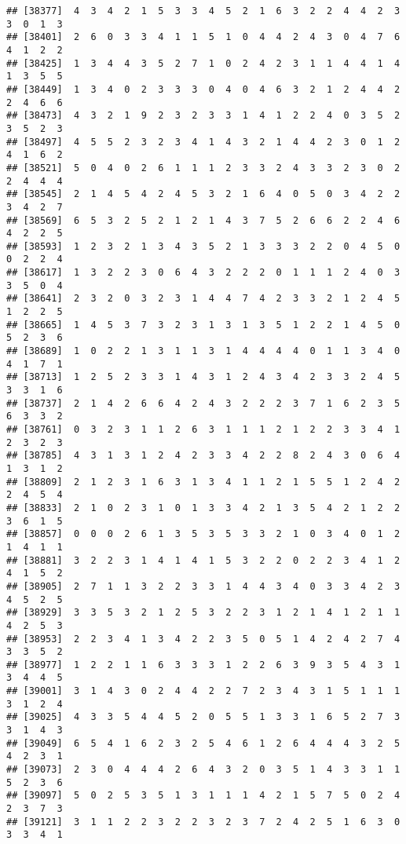 \documentclass[
]{article}
\begin{document}
\begin{verbatim}
## [38377]  4  3  4  2  1  5  3  3  4  5  2  1  6  3  2  2  4  4  2  3  3  0  1  3
## [38401]  2  6  0  3  3  4  1  1  5  1  0  4  4  2  4  3  0  4  7  6  4  1  2  2
## [38425]  1  3  4  4  3  5  2  7  1  0  2  4  2  3  1  1  4  4  1  4  1  3  5  5
## [38449]  1  3  4  0  2  3  3  3  0  4  0  4  6  3  2  1  2  4  4  2  2  4  6  6
## [38473]  4  3  2  1  9  2  3  2  3  3  1  4  1  2  2  4  0  3  5  2  3  5  2  3
## [38497]  4  5  5  2  3  2  3  4  1  4  3  2  1  4  4  2  3  0  1  2  4  1  6  2
## [38521]  5  0  4  0  2  6  1  1  1  2  3  3  2  4  3  3  2  3  0  2  2  4  4  4
## [38545]  2  1  4  5  4  2  4  5  3  2  1  6  4  0  5  0  3  4  2  2  3  4  2  7
## [38569]  6  5  3  2  5  2  1  2  1  4  3  7  5  2  6  6  2  2  4  6  4  2  2  5
## [38593]  1  2  3  2  1  3  4  3  5  2  1  3  3  3  2  2  0  4  5  0  0  2  2  4
## [38617]  1  3  2  2  3  0  6  4  3  2  2  2  0  1  1  1  2  4  0  3  3  5  0  4
## [38641]  2  3  2  0  3  2  3  1  4  4  7  4  2  3  3  2  1  2  4  5  1  2  2  5
## [38665]  1  4  5  3  7  3  2  3  1  3  1  3  5  1  2  2  1  4  5  0  5  2  3  6
## [38689]  1  0  2  2  1  3  1  1  3  1  4  4  4  4  0  1  1  3  4  0  4  1  7  1
## [38713]  1  2  5  2  3  3  1  4  3  1  2  4  3  4  2  3  3  2  4  5  3  3  1  6
## [38737]  2  1  4  2  6  6  4  2  4  3  2  2  2  3  7  1  6  2  3  5  6  3  3  2
## [38761]  0  3  2  3  1  1  2  6  3  1  1  1  2  1  2  2  3  3  4  1  2  3  2  3
## [38785]  4  3  1  3  1  2  4  2  3  3  4  2  2  8  2  4  3  0  6  4  1  3  1  2
## [38809]  2  1  2  3  1  6  3  1  3  4  1  1  2  1  5  5  1  2  4  2  2  4  5  4
## [38833]  2  1  0  2  3  1  0  1  3  3  4  2  1  3  5  4  2  1  2  2  3  6  1  5
## [38857]  0  0  0  2  6  1  3  5  3  5  3  3  2  1  0  3  4  0  1  2  1  4  1  1
## [38881]  3  2  2  3  1  4  1  4  1  5  3  2  2  0  2  2  3  4  1  2  4  1  5  2
## [38905]  2  7  1  1  3  2  2  3  3  1  4  4  3  4  0  3  3  4  2  3  4  5  2  5
## [38929]  3  3  5  3  2  1  2  5  3  2  2  3  1  2  1  4  1  2  1  1  4  2  5  3
## [38953]  2  2  3  4  1  3  4  2  2  3  5  0  5  1  4  2  4  2  7  4  3  3  5  2
## [38977]  1  2  2  1  1  6  3  3  3  1  2  2  6  3  9  3  5  4  3  1  3  4  4  5
## [39001]  3  1  4  3  0  2  4  4  2  2  7  2  3  4  3  1  5  1  1  1  3  1  2  4
## [39025]  4  3  3  5  4  4  5  2  0  5  5  1  3  3  1  6  5  2  7  3  3  1  4  3
## [39049]  6  5  4  1  6  2  3  2  5  4  6  1  2  6  4  4  4  3  2  5  4  2  3  1
## [39073]  2  3  0  4  4  4  2  6  4  3  2  0  3  5  1  4  3  3  1  1  5  2  3  6
## [39097]  5  0  2  5  3  5  1  3  1  1  1  4  2  1  5  7  5  0  2  4  2  3  7  3
## [39121]  3  1  1  2  2  3  2  2  3  2  3  7  2  4  2  5  1  6  3  0  3  3  4  1

\end{verbatim}
\end{document}
